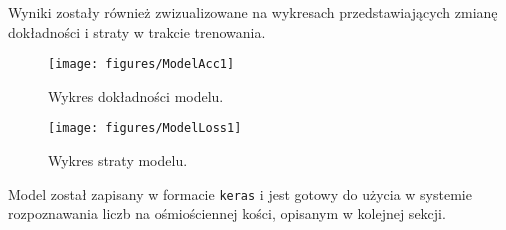 Wyniki zostały również zwizualizowane na wykresach przedstawiających zmianę dokładności i straty w trakcie trenowania.

\begin{figure}[H]
    \centering
    \texttt{[image: figures/ModelAcc1]}
    \caption{Wykres dokładności modelu.}
    \label{fig:ModelAcc}
\end{figure}

\begin{figure}[H]
    \centering
    \texttt{[image: figures/ModelLoss1]}
    \caption{Wykres straty modelu.}
    \label{fig:ModelLoss}
\end{figure}

Model został zapisany w formacie \texttt{keras} i jest gotowy do użycia w systemie rozpoznawania liczb na ośmiościennej kości, opisanym w kolejnej sekcji.

